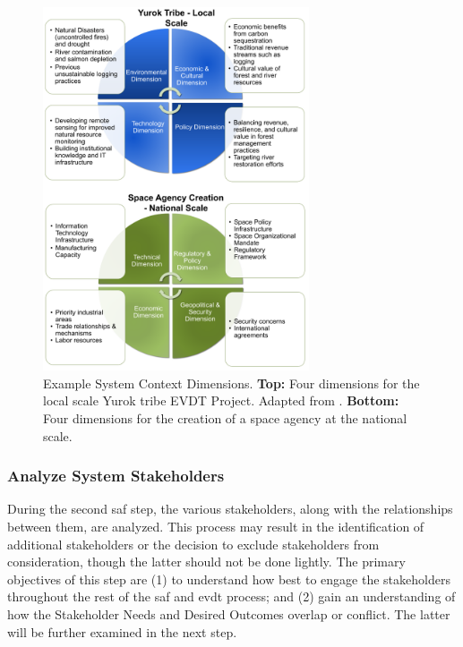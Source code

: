 \begin{figure}[!htb] 
\centering
\includegraphics[width=0.7\textwidth]{Figures/chap3/dimensions_examples.png}
\caption[Example System Context Dimensions]{Example System Context Dimensions. \textbf{Top:} Four dimensions for the local scale Yurok tribe EVDT Project. Adapted from \cite{lombardoDevelopmentDecisionSupport2021}. \textbf{Bottom:} Four dimensions for the creation of a space agency at the national scale.}
\label{fig:dimensions_example}
\end{figure} 


\subsubsection{Analyze System Stakeholders} \label{sec:saf_stakeholders}

During the second \ac{saf} step, the various stakeholders, along with the relationships between them, are analyzed. This process may result in the identification of additional stakeholders or the decision to exclude stakeholders from consideration, though the latter should not be done lightly. The primary objectives of this step are (1) to understand how best to engage the stakeholders throughout the rest of the \ac{saf} and \ac{evdt} process; and (2) gain an understanding of how the Stakeholder Needs and Desired Outcomes overlap or conflict. The latter will be further examined in the next step.

